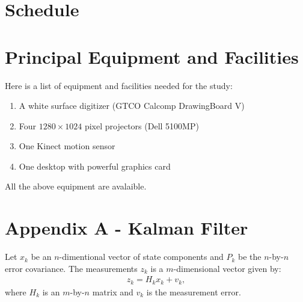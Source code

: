 \section{Schedule}
% 	
% 	
% 	
% 	
% 	
% 	 
% 	
% 	
% 	
\section{Principal Equipment and Facilities}
Here is a list of equipment and facilities needed for the study:

\begin{enumerate}
	\item A white surface digitizer (GTCO Calcomp DrawingBoard V)
	\item Four $1280\times1024$ pixel projectors (Dell 5100MP)
	\item One Kinect motion sensor
	\item One desktop with powerful graphics card
\end{enumerate}

All the above equipment are avalaible.

\section{Appendix A - Kalman Filter}
Let $x_k$ be an $n$-dimentional vector of state components and $P_k$ be the
$n$-by-$n$ error covariance. The measurements $z_k$ is a $m$-dimensional
vector given by:
\begin{align*}
z_k = H_kx_k + v_k,
\end{align*}
where $H_k$ is an $m$-by-$n$ matrix and $v_k$ is the measurement error.

